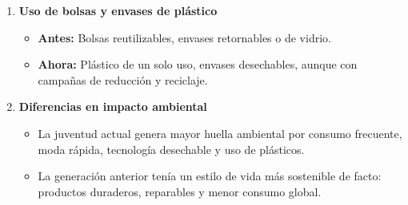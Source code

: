 \begin{solution}
\begin{enumerate}
    \item \textbf{Uso de bolsas y envases de plástico}
    \begin{itemize}
        \item \textbf{Antes:} Bolsas reutilizables, envases retornables o de vidrio.
        \item \textbf{Ahora:} Plástico de un solo uso, envases desechables, aunque con campañas de reducción y reciclaje.
    \end{itemize}

    \item \textbf{Diferencias en impacto ambiental}
    \begin{itemize}
        \item La juventud actual genera mayor huella ambiental por consumo frecuente, moda rápida, tecnología desechable y uso de plásticos.
        \item La generación anterior tenía un estilo de vida más sostenible de facto: productos duraderos, reparables y menor consumo global.
    \end{itemize}
\end{enumerate}
\end{solution}
